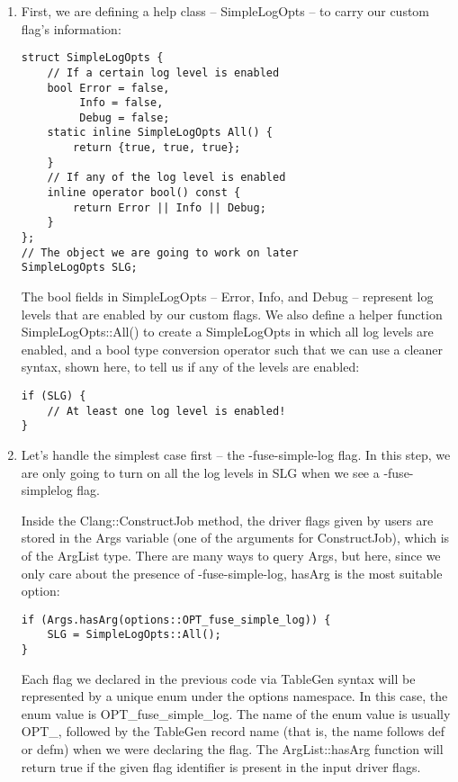 \begin{enumerate}
\item First, we are defining a help class – SimpleLogOpts – to carry our custom flag's information:
\begin{lstlisting}[style=styleCXX]
struct SimpleLogOpts {
	// If a certain log level is enabled
	bool Error = false,
	     Info = false,
	     Debug = false;
	static inline SimpleLogOpts All() {
		return {true, true, true};
	}
	// If any of the log level is enabled
	inline operator bool() const {
		return Error || Info || Debug;
	}
};
// The object we are going to work on later
SimpleLogOpts SLG;
\end{lstlisting}

The bool fields in SimpleLogOpts – Error, Info, and Debug – represent log levels that are enabled by our custom flags. We also define a helper function SimpleLogOpts::All() to create a SimpleLogOpts in which all log levels are enabled, and a bool type conversion operator such that we can use a cleaner syntax, shown here, to tell us if any of the levels are enabled:

\begin{lstlisting}[style=styleCXX]
if (SLG) {
	// At least one log level is enabled!
}
\end{lstlisting}

\item Let's handle the simplest case first – the -fuse-simple-log flag. In this step, we are only going to turn on all the log levels in SLG when we see a -fuse-simplelog flag.

Inside the Clang::ConstructJob method, the driver flags given by users are  stored in the Args variable (one of the arguments for ConstructJob), which is of the ArgList type. There are many ways to query Args, but here, since we only care about the presence of -fuse-simple-log, hasArg is the most suitable option:

\begin{lstlisting}[style=styleCXX]
if (Args.hasArg(options::OPT_fuse_simple_log)) {
	SLG = SimpleLogOpts::All();
}
\end{lstlisting}

Each flag we declared in the previous code via TableGen syntax will be represented by a unique enum under the options namespace. In this case, the enum value is OPT\_fuse\_simple\_log. The name of the enum value is usually OPT\_, followed by the TableGen record name (that is, the name follows def or defm) when we were declaring the flag. The ArgList::hasArg function will return true if the given flag identifier is present in the input driver flags.


\end{enumerate}
